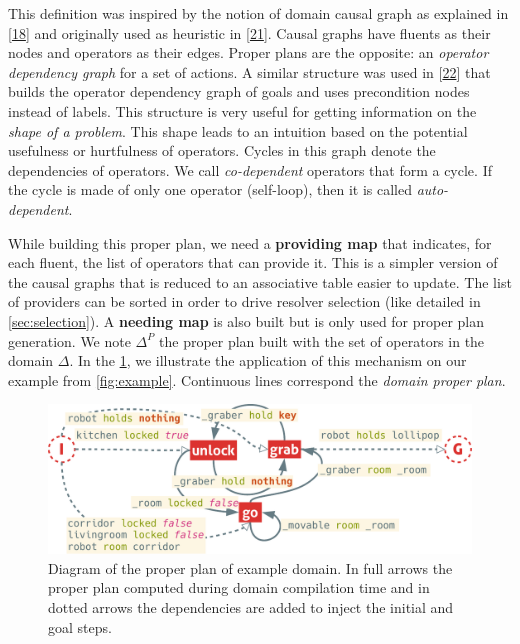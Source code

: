 This definition was inspired by the notion of domain causal graph as
explained in
{[}\protect\hyperlink{ref-gobelbeckerux5fcomingux5f2010}{18}{]} and
originally used as heuristic in
{[}\protect\hyperlink{ref-helmertux5ffastux5f2006}{21}{]}. Causal graphs
have fluents as their nodes and operators as their edges. Proper plans
are the opposite: an \emph{operator dependency graph} for a set of
actions. A similar structure was used in
{[}\protect\hyperlink{ref-smithux5fpostponingux5f1993}{22}{]} that
builds the operator dependency graph of goals and uses precondition
nodes instead of labels. This structure is very useful for getting
information on the \emph{shape of a problem}. This shape leads to an
intuition based on the potential usefulness or hurtfulness of operators.
Cycles in this graph denote the dependencies of operators. We call
\emph{co-dependent} operators that form a cycle. If the cycle is made of
only one operator (self-loop), then it is called \emph{auto-dependent}.

While building this proper plan, we need a \textbf{providing map} that
indicates, for each fluent, the list of operators that can provide it.
This is a simpler version of the causal graphs that is reduced to an
associative table easier to update. The list of providers can be sorted
in order to drive resolver selection (like detailed in
\cref{sec:selection}). A \textbf{needing map} is also built but is only
used for proper plan generation. We note \(\Delta^P\) the proper plan
built with the set of operators in the domain \(\Delta\). In the
\cref{fig:properplan}, we illustrate the application of this mechanism
on our example from \cref{fig:example}. Continuous lines correspond the
\emph{domain proper plan}.

\begin{figure}[htbp]
\centering
\includegraphics{graphics/properplan.pdf}
\caption{\label{fig:properplan}Diagram of the proper plan of example
domain. In full arrows the proper plan computed during domain
compilation time and in dotted arrows the dependencies are added to
inject the initial and goal steps.}
\end{figure}

